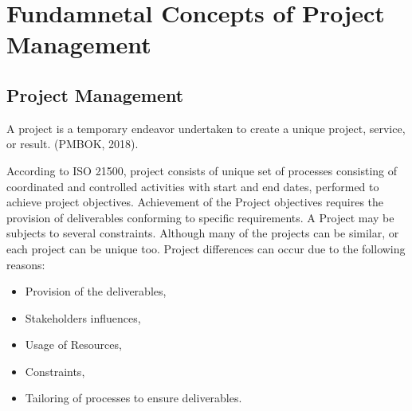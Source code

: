 %
%
\let\textcircled=\pgftextcircled
\chapter{Fundamnetal Concepts of Project Management}
\label{chap:intro}


 
 \section{Project Management}
 \label{sec:sec001}
 A project is a temporary endeavor undertaken to create a unique project, service, or result. (PMBOK, 2018).

According to ISO 21500, project consists of unique set of processes consisting of coordinated and controlled activities with start and end dates, performed to achieve project objectives. Achievement of the Project objectives requires the provision of deliverables conforming to specific requirements. A Project may be subjects to several constraints. Although many of the projects can be similar, or each project can be unique too. Project differences can occur due to the following reasons:
 \begin{itemize}
     \item Provision of the deliverables,
     \item Stakeholders influences, 
     \item Usage of Resources,
     \item Constraints,
     \item Tailoring of processes to ensure deliverables.
 \end{itemize}
     


